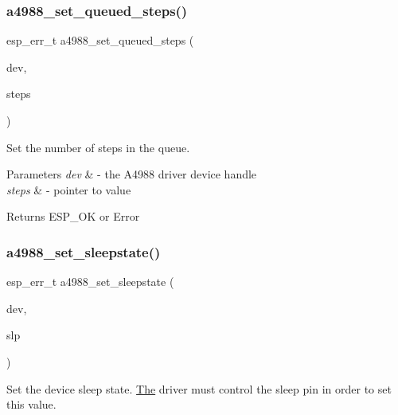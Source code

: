 \subsubsection{\texorpdfstring{a4988\+\_\+set\+\_\+queued\+\_\+steps()}{a4988\_set\_queued\_steps()}}
{\footnotesize\ttfamily esp\+\_\+err\+\_\+t a4988\+\_\+set\+\_\+queued\+\_\+steps (\begin{DoxyParamCaption}\item[{\hyperlink{group__A4988__definitions_ga16590a9dd79ad8fcf4c317be2659b6c5}{A4988\+\_\+\+D\+EV}}]{dev,  }\item[{\hyperlink{vl53l0x__types_8h_a273cf69d639a59973b6019625df33e30}{uint16\+\_\+t} $\ast$}]{steps }\end{DoxyParamCaption})}



Set the number of steps in the queue. 


\begin{DoxyParams}{Parameters}
{\em dev} & -\/ the A4988 driver device handle \\
\hline
{\em steps} & -\/ pointer to value \\
\hline
\end{DoxyParams}
\begin{DoxyReturn}{Returns}
E\+S\+P\+\_\+\+OK or Error 
\end{DoxyReturn}
\mbox{\label{group__A4988__Driver__functions_gafe87a246c0e96cec94f730677c70f96d}} 
\subsubsection{\texorpdfstring{a4988\+\_\+set\+\_\+sleepstate()}{a4988\_set\_sleepstate()}}
{\footnotesize\ttfamily esp\+\_\+err\+\_\+t a4988\+\_\+set\+\_\+sleepstate (\begin{DoxyParamCaption}\item[{\hyperlink{group__A4988__definitions_ga16590a9dd79ad8fcf4c317be2659b6c5}{A4988\+\_\+\+D\+EV}}]{dev,  }\item[{bool $\ast$}]{slp }\end{DoxyParamCaption})}



Set the device sleep state. \hyperlink{structThe}{The} driver must control the sleep pin in order to set this value. 



